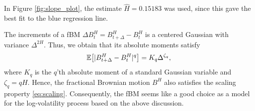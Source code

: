In Figure \ref{fig:slope_plot}, the estimate $\hat{H}=0.15183$ was used, since this gave the best fit to the blue regression line.
 
 The increments of a fBM $\Delta B_{t}^{H}=B_{t+\Delta}^{H}-B_{t}^{H}$ is a centered Gaussian with variance $\Delta^{2H}$. Thus, we obtain that its absolute moments satisfy 
 \begin{equation}
     \E\left[|B^{H}_{t+\Delta}-B_{t}^{H}|^{q}\right]=K_{q}\Delta^{\zeta_{q}},
 \end{equation}
 where $K_{q}$ is the $q$'th absolute moment of a standard Gaussian variable and $\zeta_{q}=qH$. Hence, the fractional Brownian motion $B^{H}$ also satisfies the scaling property \eqref{eq:scaling}. Consequently, the fBM seems like a good choice as a model for the log-volatility process based on the above discussion.
 
